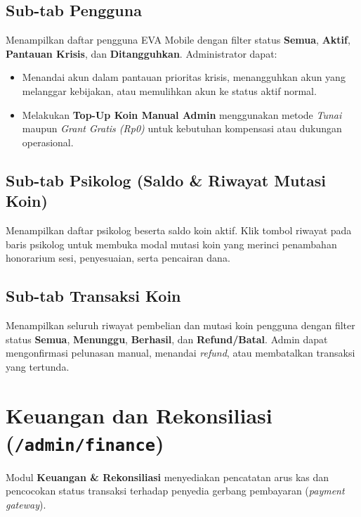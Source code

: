 \subsection{Sub-tab Pengguna}
Menampilkan daftar pengguna EVA Mobile dengan filter status \textbf{Semua}, \textbf{Aktif}, \textbf{Pantauan Krisis}, dan \textbf{Ditangguhkan}. Administrator dapat:
\begin{itemize}[leftmargin=1.4em]
  \item Menandai akun dalam pantauan prioritas krisis, menangguhkan akun yang melanggar kebijakan, atau memulihkan akun ke status aktif normal.
  \item Melakukan \textbf{Top-Up Koin Manual Admin} menggunakan metode \textit{Tunai} maupun \textit{Grant Gratis (Rp0)} untuk kebutuhan kompensasi atau dukungan operasional.
\end{itemize}

\subsection{Sub-tab Psikolog (Saldo \& Riwayat Mutasi Koin)}
Menampilkan daftar psikolog beserta saldo koin aktif. Klik tombol riwayat pada baris psikolog untuk membuka modal mutasi koin yang merinci penambahan honorarium sesi, penyesuaian, serta pencairan dana.

\subsection{Sub-tab Transaksi Koin}
Menampilkan seluruh riwayat pembelian dan mutasi koin pengguna dengan filter status \textbf{Semua}, \textbf{Menunggu}, \textbf{Berhasil}, dan \textbf{Refund/Batal}. Admin dapat mengonfirmasi pelunasan manual, menandai \textit{refund}, atau membatalkan transaksi yang tertunda.


\section{Keuangan dan Rekonsiliasi (\texttt{/admin/finance})}
Modul \textbf{Keuangan \& Rekonsiliasi} menyediakan pencatatan arus kas dan pencocokan status transaksi terhadap penyedia gerbang pembayaran (\textit{payment gateway}).

